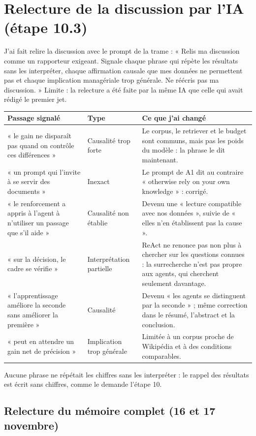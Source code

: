 \documentclass[10pt,a4paper]{article}
\begin{document}
\section{Relecture de la discussion par l'IA (étape 10.3)}

J'ai fait relire la discussion avec le prompt de la trame : « Relis ma discussion comme un rapporteur exigeant. Signale chaque phrase qui répète les résultats sans les interpréter, chaque affirmation causale que mes données ne permettent pas et chaque implication managériale trop générale. Ne réécris pas ma discussion. » Limite : la relecture a été faite par la même IA que celle qui avait rédigé le premier jet.

\small
\begin{longtable}{@{}P{5.6cm}P{3cm}P{7cm}@{}}
\toprule
Passage signalé & Type & Ce que j'ai changé\\
\midrule\endhead
« le gain ne disparaît pas quand on contrôle ces différences » & Causalité trop forte & Le corpus, le retriever et le budget sont communs, mais pas les poids du modèle : la phrase le dit maintenant.\\
« un prompt qui l'invite à se servir des documents » & Inexact & Le prompt de A1 dit au contraire « otherwise rely on your own knowledge » : corrigé.\\
« le renforcement a appris à l'agent à n'utiliser un passage que s'il aide » & Causalité non établie & Devenu une « lecture compatible avec nos données », suivie de « elles n'en établissent pas la cause ».\\
« sur la décision, le cadre se vérifie » & Interprétation partielle & ReAct ne renonce pas non plus à chercher sur les questions connues : la surrecherche n'est pas propre aux agents, qui cherchent seulement davantage.\\
« l'apprentissage améliore la seconde sans améliorer la première » & Causalité & Devenu « les agents se distinguent par la seconde » ; même correction dans le résumé, l'abstract et la conclusion.\\
« peut en attendre un gain net de précision » & Implication trop générale & Limitée à un corpus proche de Wikipédia et à des conditions comparables.\\
\bottomrule
\end{longtable}
\normalsize

Aucune phrase ne répétait les chiffres sans les interpréter : le rappel des résultats est écrit sans chiffres, comme le demande l'étape 10.

\subsection*{Relecture du mémoire complet (16 et 17 novembre)}
\end{document}
